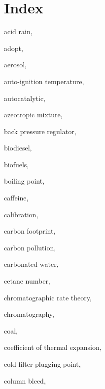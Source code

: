 
\chapter{Index} %

\label{AppendixA} %


\begin{theindex}
  
  \item \lowercase {acid rain}, 
  \item \lowercase {adopt}, 
  \item \lowercase {aerosol}, 
  \item \lowercase {auto-ignition temperature}, 
  \item \lowercase {autocatalytic}, 
  \item \lowercase {azeotropic mixture}, 
  \item \lowercase {back pressure regulator}, 
  \item \lowercase {biodiesel}, 
  \item \lowercase {biofuels}, 
  \item \lowercase {boiling point}, 
  \item \lowercase {caffeine}, 
  \item \lowercase {calibration}, 
  \item \lowercase {carbon footprint}, 
  \item \lowercase {carbon pollution}, 
  \item \lowercase {carbonated water}, 
  \item \lowercase {cetane number}, 
  \item \lowercase {chromatographic rate theory}, 
  \item \lowercase {chromatography}, 
  \item \lowercase {coal}, 
  \item \lowercase {coefficient of thermal expansion}, 
  \item \lowercase {cold filter plugging point}, 
  \item \lowercase {column bleed}, 

\end{theindex}
